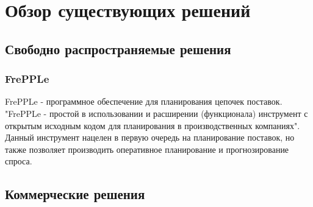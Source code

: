 \section{Обзор существующих решений}
\subsection{Свободно распространяемые решения}
\subsubsection{FrePPLe}
\indent FrePPLe - программное обеспечение для планирования цепочек поставок.
"FrePPLe - простой в использовании и расширении (функционала) инструмент с открытым исходным кодом для планирования в производственных компаниях".
Данный инструмент нацелен в первую очередь на планирование поставок, но также позволяет производить оперативное планирование и прогнозирование спроса.

\subsection{Коммерческие решения}
